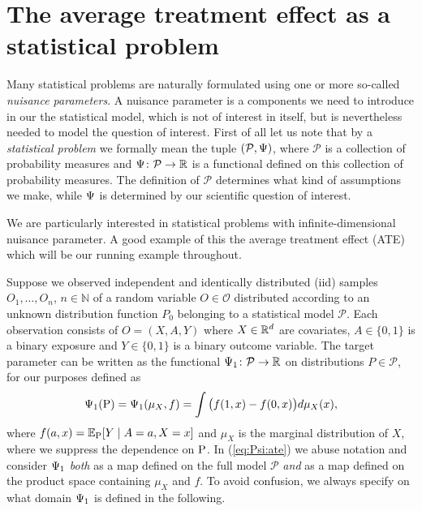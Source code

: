 \documentclass[a4,danish]{article}
\begin{document}
\section{The average treatment effect as a statistical problem}
\label{sec:introduction}

Many statistical problems are naturally formulated using one or more so-called \textit{nuisance
  parameters}. A nuisance parameter is a components we need to introduce in our the statistical
model, which is not of interest in itself, but is nevertheless needed to model the question of
interest. First of all let us note that by a \textit{statistical problem} we formally mean the tuple
$(\mathcal{P}, \TT)$, where $\mathcal{P}$ is a collection of probability measures and
$\TT \colon \mathcal{P} \rightarrow \R$ is a functional defined on this collection of probability
measures. The definition of $\mathcal{P}$ determines what kind of assumptions we make, while $\TT$
is determined by our scientific question of interest. 

We are particularly interested in statistical problems with infinite-dimensional nuisance parameter.
A good example of this the average treatment effect (ATE) which will be our running example
throughout.

\begin{example}[ATE]
  \label{example:aver-treatm-effect}
  Suppose we observed independent and identically distributed (iid) samples \(O_1,\ldots,O_n\),
  \(n\in\mathbb{N}\) of a random variable \(O \in\mathcal{O}\) distributed according to an unknown
  distribution function \(P_0\) belonging to a statistical model \(\mathcal{P}\). Each observation
  consists of \(O= (X, A, Y)\) where \(X\in \R^d\) are covariates, \(A\in \lbrace 0,1\rbrace\) is a
  binary exposure and \(Y\in\lbrace 0, 1\rbrace\) is a binary outcome variable. The target parameter
  can be written as the functional \(\TT_1 \colon \mathcal{P} \rightarrow \R\) on distributions
  \(P\in\mathcal{P}\), for our purposes defined as
  \begin{align}
    \TT_1(\P) = \TT_1( \mu_X, f) = \int \big( f( 1, x) - f(0, x) \big) d\mu_X (x), 
    \label{eq:Psi:ate}
  \end{align}
  where \(f (a, x) = \E_{\P} [ Y \mid A=a, X=x]\) and \(\mu_X \) is the marginal distribution of
  \(X\), where we suppress the dependence on $\P$. In (\ref{eq:Psi:ate}) we abuse notation and
  consider $\TT_1$ \textit{both} as a map defined on the full model $\mathcal{P}$ \textit{and} as a
  map defined on the product space containing $\mu_X$ and $f$. To avoid confusion, we always specify
  on what domain $\TT_1$ is defined in the following.
\end{example}
\end{document}
